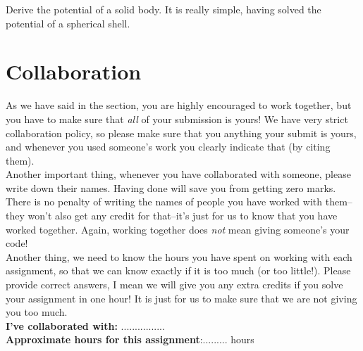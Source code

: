 \documentclass[paper=a4, fontsize=11pt]{scrartcl} %
\numberwithin{equation}{section} %
\numberwithin{figure}{section} %
\numberwithin{table}{section} %
\begin{document}
Derive the potential of a solid body. It is really simple, having solved the potential of a spherical shell.


\section{Collaboration}
As we have said in the section, you are highly encouraged to work together, but you have to make sure that \textit{all} of your submission is yours! We have very strict collaboration policy, so please make sure that you anything your submit is yours, and whenever you used someone's work you clearly indicate that (by citing them).\\
Another important thing, whenever you have collaborated with someone, please write down their names. Having done will save you from getting zero marks. There is no penalty of writing the names of people you have worked with them--they won't also get any credit for that--it's just for us to know that you have worked together. Again, working together does \textit{not} mean giving someone's your code!\\
Another thing, we need to know the hours you have spent on working with each assignment, so that we can know exactly if it is too much (or too little!). Please provide correct answers, I mean we will give you any extra credits if you solve your assignment in one hour! It is just for us to make sure that we are not giving you too much.
\\

\textbf{I've collaborated with:} ................\\
\textbf{Approximate hours for this assignment}:......... hours


 
\end{document}
